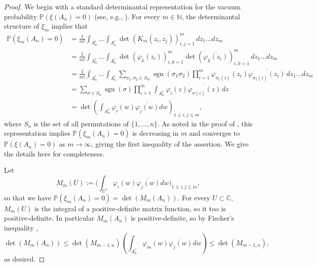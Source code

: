 \documentclass{amsart}
\theoremstyle{plain}
\theoremstyle{definition}
\theoremstyle{remark}
\begin{document}
\begin{proof}
We begin with a standard determinantal representation for the vacuum probability $\mathbb P(\xi(A_n)=0)$ (see, e.g., \cite[Theorem 6]{adhikari2017hole}). 
For every $m \in \mathbb{N}$, the  determinantal structure of $\xi_m$  implies that 
\begin{align*}
\mathbb P(\xi_m(A_n)=0)
&=
\frac{1}{m!}
\int_{A_n^c}\dots \int_{A_n^c} \det (K_m(z_i,z_j))_{i,j=1}^m  \, dz_1\dots dz_m\\
& = 
\frac{1}{m!}\int_{A_n^c}\dots \int_{A_n^c} \det (\varphi_k(z_i) )_{i,k=1}^m \det (\overline{\varphi_k(z_i)} )_{i,k=1}^m   \, dz_1\dots dz_m\\
&= 
\frac{1}{m!}\int_{A_n^c}\dots \int_{A_n^c}    \sum_{\sigma_1, \sigma_2  \in S_m} \operatorname{sgn}(\sigma_1 \sigma_2)  
 \prod_{i=1}^m \varphi_{\sigma_1(i)}(z_i) \overline{\varphi_{\sigma_2(i)}(z_i)}  \, dz_1\dots dz_m\\
&=
\sum_{\sigma \in S_n} \operatorname{sgn}(\sigma) \prod_{i=1}^m \int_{A_n^c} \varphi_i(z) \overline{\varphi_{\sigma(i) }(z)}\, dz\\
& =\det  \left(\int_{A_n^c} \varphi_i(w) \overline{\varphi_j(w)} dw\right)_{1\le i,j\le m},
\end{align*}
where $S_n$ is the set of all permutations of $\{1,\dots,n\}$. As noted in the proof of \cite[Theorem 6]{adhikari2017hole}, this representation implies $\mathbb P(\xi_m(A_n)=0)$ is decreasing in $m$ and converges to $\mathbb P(\xi(A_n)=0)$ as $m \to \infty$, giving the first inequality of the assertion. We give the details here for completeness. 

Let \[ M_{m}(U):=\Big(\int_{U^c} \varphi_i(w) \overline{\varphi_j(w)} dw\Big)_{1\le i,j\le m},\] so that we have $\mathbb P(\xi_m(A_n)=0)=\det(M_{m}(A_n))$. 
For every $U\subset \mathbb{C}$, $M_{m}(U)$ is the integral of a positive-definite matrix function, so it too is positive-definite. 
In particular $ M_{m}(A_n)$ is positive-definite, so by Fischer's inequality \cite[Theorem 7.8.5]{horn2012matrix},
\[
\det ( M_{m}(A_n) ) \le \det ( M_{m-1,n} )  \left(  \int_{A_n^c} \varphi_m(w)   \overline{\varphi_j(w)} dw \right) \le \det ( M_{m-1,n} ),
\]
as desired.



\end{proof}
\end{document}

